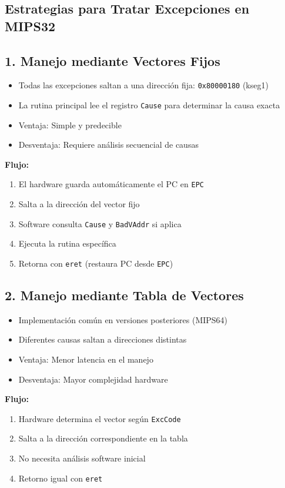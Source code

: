 \documentclass{article}
\begin{document}
\subsection{Estrategias para Tratar Excepciones en MIPS32}

\subsection{1. Manejo mediante Vectores Fijos}
\begin{itemize}
    \item Todas las excepciones saltan a una dirección fija: \texttt{0x80000180} (kseg1)
    \item La rutina principal lee el registro \texttt{Cause} para determinar la causa exacta
    \item Ventaja: Simple y predecible
    \item Desventaja: Requiere análisis secuencial de causas
\end{itemize}

\textbf{Flujo:}
\begin{enumerate}
    \item El hardware guarda automáticamente el PC en \texttt{EPC}
    \item Salta a la dirección del vector fijo
    \item Software consulta \texttt{Cause} y \texttt{BadVAddr} si aplica
    \item Ejecuta la rutina específica
    \item Retorna con \texttt{eret} (restaura PC desde \texttt{EPC})
\end{enumerate}

\subsection{2. Manejo mediante Tabla de Vectores}
\begin{itemize}
    \item Implementación común en versiones posteriores (MIPS64)
    \item Diferentes causas saltan a direcciones distintas
    \item Ventaja: Menor latencia en el manejo
    \item Desventaja: Mayor complejidad hardware
\end{itemize}

\textbf{Flujo:}
\begin{enumerate}
    \item Hardware determina el vector según \texttt{ExcCode}
    \item Salta a la dirección correspondiente en la tabla
    \item No necesita análisis software inicial
    \item Retorno igual con \texttt{eret}
\end{enumerate}
\end{document}
